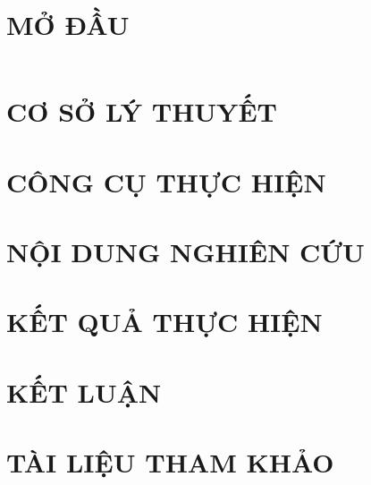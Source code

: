 \documentclass[runningheads]{llncs}
\begin{document}
	\fontsize{13pt}{18pt}\selectfont %
	\setlength{\baselineskip}{18truept}
	
	\chapter*{MỞ ĐẦU}
	
	
	\tableofcontents %
	\newpage
	\listoffigures %
	\newpage
	\listoftables %

	\glsaddall 
	\renewcommand*{\glossaryname}{DANH SÁCH THUẬT NGỮ}
	\renewcommand*{\acronymname}{Danh sách từ viết tắt}
	\renewcommand*{\entryname}{Tiếng Anh}
	\renewcommand*{\descriptionname}{Tiếng Việt}
	\printnoidxglossary
	
	\begin{tabular}{l l }
		
	\end{tabular}
	
	\chapter{CƠ SỞ LÝ THUYẾT} %
	
	\newpage
	
	\chapter{CÔNG CỤ THỰC HIỆN} %
	
	\newpage
	
	\chapter{NỘI DUNG NGHIÊN CỨU} %
	
	\newpage

	\chapter{KẾT QUẢ THỰC HIỆN} %
	
	\newpage

	\chapter{KẾT LUẬN} %
	
	\newpage
	
	
	\chapter*{TÀI LIỆU THAM KHẢO}
	
	
\end{document}
